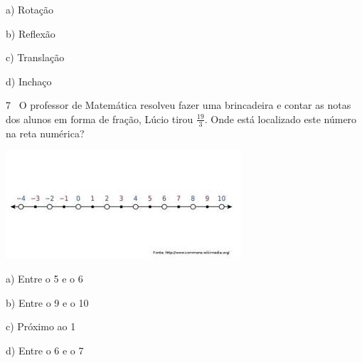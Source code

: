 a) Rotação

b) Reflexão

c) Translação

d) Inchaço



\num{7}~ O professor de Matemática resolveu fazer uma brincadeira e contar as
notas dos alunos em forma de fração, Lúcio tirou \(\frac{19}{3}\). Onde
está localizado este número na reta numérica?

\includegraphics{./imgSAEB_7_MAT/media/image109.png}

a) Entre o 5 e o 6

b) Entre o 9 e o 10

c) Próximo ao 1

d) Entre o 6 e o 7



